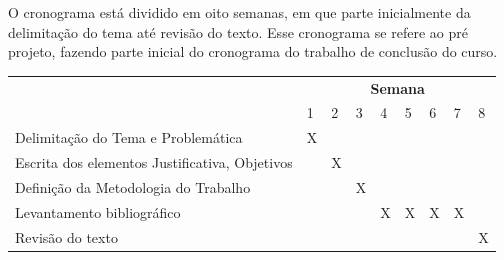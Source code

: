 \documentclass[12pt,openright,oneside,a4paper,ruledheader,pnumromarab,english]{abntex2}
\begin{document}
O cronograma está dividido em oito semanas, em que parte inicialmente da delimitação do tema até revisão do texto. Esse cronograma se refere ao pré projeto, fazendo parte inicial do cronograma do trabalho de conclusão do curso. 
\begin{table}[!htb]
\begin{tabular}{|l|l|l|l|l|l|l|l|l|}
\hline
\rowcolor[HTML]{C0C0C0} 
\cellcolor[HTML]{C0C0C0}                                              & \multicolumn{8}{c|}{\cellcolor[HTML]{C0C0C0}\textbf{Semana}}                                                                                                                                                            \\ \cline{2-9} 
\rowcolor[HTML]{C0C0C0} 
\multirow{-2}{*}{\cellcolor[HTML]{C0C0C0}\textbf{Atividades}}                  & 1                       & 2                        & 3                       & 4                       & 5                       & 6                       & 7                       & 8                       \\ \hline
Delimitação do Tema e Problemática                                    & X                       &                          &                         &                         &                         &                         &                         &                         \\ \hline
\rowcolor[HTML]{C0C0C0} 
{\color[HTML]{000000} Escrita dos elementos Justificativa, Objetivos} & {\color[HTML]{000000} } & {\color[HTML]{000000} X} & {\color[HTML]{000000} } & {\color[HTML]{000000} } & {\color[HTML]{000000} } & {\color[HTML]{000000} } & {\color[HTML]{000000} } & {\color[HTML]{000000} } \\ \hline
Definição da Metodologia do Trabalho                                  &                         &                          & X                       &                         &                         &                         &                         &                         \\ \hline
\rowcolor[HTML]{C0C0C0} 
Levantamento bibliográfico                                            &                         &                          &                         & X                       & X                       & X                       & X                       &                         \\ \hline
Revisão do texto                                                      &                         &                          &                         &                         &                         &                         &                         & X                       \\ \hline
\end{tabular}
\end{table}




%


\end{document}
